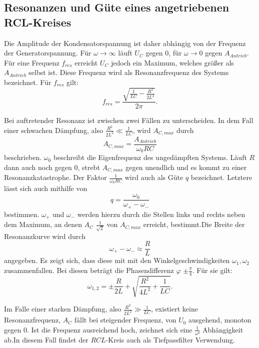 \subsection{Resonanzen und Güte eines angetriebenen RCL-Kreises}

Die Amplitude der Kondensatorspannung ist daher abhängig von der Frequenz der Generatorspannung.
Für $\omega \to \infty$ läuft $U_C$ gegen 0, für $\omega \to 0$ gegen $A_{Antrieb}$.
Für eine Frequenz $f_{res}$ erreicht $U_C$  jedoch ein Maximum, welches größer als $A_{Antrieb}$ selbst ist.
Diese Frequenz wird als Resonanzfrequenz des Systems bezeichnet. Für $f_{res}$ gilt:
\begin{equation}
  f_{res} = \frac{\sqrt{\frac{1}{LC}-\frac{R^2}{2L^2}}}{2 \pi}\text{.}
\end{equation}

Bei auftretender Resonanz ist zwischen zwei Fällen zu unterscheiden.
In dem Fall einer schwachen Dämpfung, also $\frac{R^2}{2L^2} \ll \frac{1}{LC}$, wird  $A_{C,max}$ durch
\begin{equation}
  A_{C,max} = \frac{A_{Antrieb}}{\omega_0 RC}
\end{equation}
beschrieben. $\omega_0$ beschreibt die Eigenfrequenz des ungedämpften Systems.
Läuft $R$ dann auch noch gegen 0, strebt $A_{C,max}$ gegen unendlich und es kommt zu einer
Resonanzkatastrophe.
 Der Faktor $\frac{1}{\omega_0 RC}$ wird auch als Güte $q$ bezeichnet.
Letztere lässt sich auch mithilfe von
\begin{equation}
  q = \frac{\omega_0}{\omega_+ - \omega_-}
  \end{equation}
bestimmen. $\omega_+$ und $\omega_-$ werden  hierzu durch die Stellen links und rechts neben dem Maximum,
 an denen $A_C$ $\frac{1}{\sqrt{2}}$ von $A_{C,max}$ erreicht, bestimmt.Die Breite der Resonanzkurve wird durch
 \begin{equation}
   \omega_+ - \omega_- \approx \frac{R}{L}
 \end{equation}
 angegeben. Es zeigt sich, dass diese mit mit den Winkelgeschwindigkeiten $\omega_1,\omega_2$ zusammenfallen.
  Bei diesen beträgt die Phasendifferenz $\varphi$ $\pm \frac{\pi}{4}$. Für sie gilt:
\begin{equation}
  \omega_{1,2} = \pm \frac{R}{2L} + \sqrt{\frac{R^2}{4L^2} + \frac{1}{LC}}\text{.}
\end{equation}

 Im Falle einer starken Dämpfung, also $\frac{R^2}{2L^2} \gg \frac{1}{LC}$, existiert keine Resonanzfrequenz, $A_C$ fällt bei steigender Frequenz, von $U_0$ ausgehend, monoton gegen 0. Ist die Frequenz ausreichend hoch, zeichnet
  sich eine $\frac{1}{\omega²}$ Abhängigkeit ab.In diesem Fall findet der $RCL$-Kreis auch als Tiefpassfilter Verwendung.
